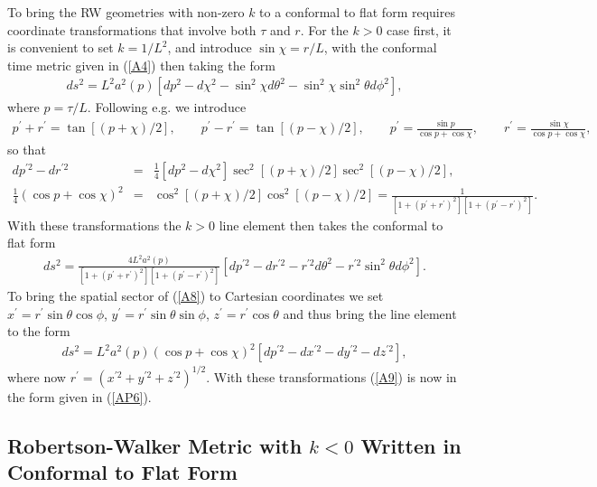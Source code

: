 \documentclass[aps]{revtex4}
\begin{document}
To bring the RW geometries with non-zero $k$ to a conformal to flat form requires coordinate transformations that involve both $\tau$ and $r$. For the $k>0$ case first, it is convenient to set $k=1/L^2$, and introduce $\sin \chi=r/L$, with the conformal time metric given in (\ref{A4}) then taking the form
%
\begin{eqnarray}
ds^2=L^2a^2(p)\left[dp^2-d\chi^2 -\sin^2\chi d\theta^2-\sin^2\chi \sin^2\theta d\phi^2\right],
\label{A5}
\end{eqnarray}
%
where $p=\tau/L$. Following e.g. \cite{Mannheim2012a} we introduce
%
\begin{eqnarray}
p^{\prime}+r^{\prime}=\tan[(p+\chi)/2],\qquad p^{\prime}-r^{\prime}=\tan[(p-\chi)/2],\qquad p^{\prime}=\frac{\sin p}{\cos p+\cos \chi},\qquad r^{\prime}=\frac{\sin \chi}{\cos p+\cos \chi},
\label{A6}
\end{eqnarray}
%
so that
%
\begin{eqnarray}
dp^{\prime 2}-dr^{\prime 2}&=&\frac{1}{4}[dp^2-d\chi^2]\sec^2[(p+\chi)/2]\sec^2[(p-\chi)/2],
\nonumber\\
\frac{1}{4}(\cos p +\cos \chi)^2&=&\cos^2[(p+\chi)/2]\cos^2[(p-\chi)/2]=\frac{1}{[1+(p^{\prime}+r^{\prime})^2][1+(p^{\prime}-r^{\prime})^2]}.
\label{A7}
\end{eqnarray}
%
With these transformations the $k>0$ line element then takes the conformal to flat form
%
\begin{eqnarray}
ds^2=\frac{4L^2a^2(p)}{[1+(p^{\prime}+r^{\prime})^2][1+(p^{\prime}-r^{\prime})^2]}\left[dp^{\prime 2}-dr^{\prime 2} -r^{\prime 2}d\theta^2-r^{\prime 2} \sin^2\theta d\phi^2\right].
\label{A8}
\end{eqnarray}
%
To bring the spatial sector  of (\ref{A8}) to Cartesian coordinates we set  $x^{\prime}=r^{\prime}\sin\theta\cos\phi$, $y^{\prime}=r^{\prime}\sin\theta\sin\phi$, $z^{\prime}=r^{\prime}\cos\theta$ and thus bring the line element to the form  
%
\begin{eqnarray}
ds^2=L^2a^2(p)(\cos p+\cos \chi)^2\left[dp^{\prime 2}-dx^{\prime 2} -dy^{\prime 2} -dz^{\prime 2} \right],
\label{A9}
\end{eqnarray}
%
where now $r^{\prime}=(x^{\prime 2}+ y^{\prime 2}+z^{\prime 2})^{1/2}$. With these transformations (\ref{A9}) is now in the form given in (\ref{AP6}).

\subsection{Robertson-Walker Metric with $k<0$  Written in Conformal to Flat Form}
\end{document}

